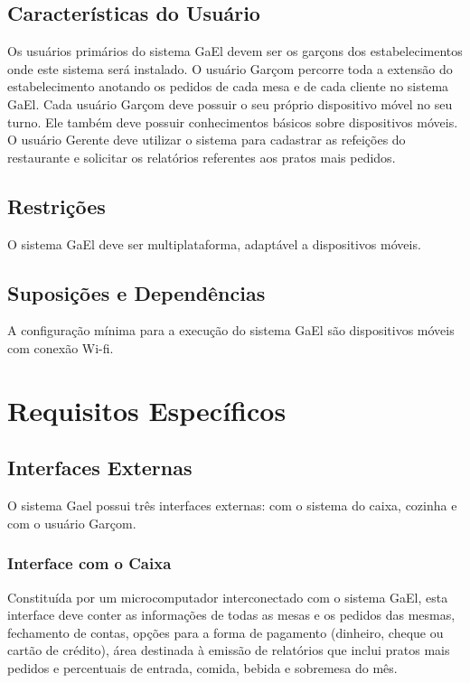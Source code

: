 \documentclass[11pt,a4paper]{article}
\begin{document}
\subsection{Características do Usuário}

Os usuários primários do sistema GaEl devem ser os garçons dos estabelecimentos onde este sistema será instalado. O usuário Garçom percorre toda a extensão do estabelecimento anotando os pedidos de cada mesa e de cada cliente no sistema GaEl. Cada usuário Garçom deve possuir o seu próprio dispositivo móvel no seu turno. Ele também deve possuir conhecimentos básicos sobre dispositivos móveis. O usuário Gerente deve utilizar o sistema para cadastrar as refeições do restaurante e solicitar os relatórios referentes aos pratos mais pedidos.

\subsection{Restrições}

O sistema GaEl deve ser multiplataforma, adaptável a dispositivos móveis.

\subsection{Suposições e Dependências}

A configuração mínima para a execução do sistema GaEl são dispositivos móveis com conexão Wi-fi.

\section{Requisitos Específicos}

\subsection{Interfaces Externas}

O sistema Gael possui três interfaces externas: com o sistema do caixa, cozinha e com o usuário Garçom.

\subsubsection{Interface com o Caixa}

Constituída por um microcomputador interconectado com o sistema GaEl, esta interface deve conter as informações de todas as mesas e os pedidos das mesmas, fechamento de contas, opções para a forma de pagamento (dinheiro, cheque ou cartão de crédito), área destinada à emissão de relatórios que inclui pratos mais pedidos e percentuais de entrada, comida, bebida e sobremesa do mês.
\end{document}
